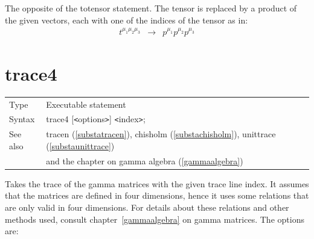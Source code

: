 \noindent The opposite of the totensor 
statement. The tensor is replaced by a product of the given vectors, each 
with one of the indices of the tensor as in:
\begin{eqnarray}
    t^{\mu_1\mu_2\mu_3} & \rightarrow & p^{\mu_1}p^{\mu_2}p^{\mu_3} \nonumber
\end{eqnarray}\vspace{10mm}


\section{trace4}
\label{substatrace}

\noindent \begin{tabular}{ll}
Type & Executable statement\\
Syntax & trace4 [{\tt<}options{\tt>}] {\tt<}index{\tt>}; \\
See also & tracen (\ref{substatracen}), chisholm (\ref{substachisholm}),
    unittrace (\ref{substaunittrace}) \\ &
    and the chapter on gamma algebra (\ref{gammaalgebra})
\end{tabular} \vspace{4mm}

\noindent Takes the trace of the gamma 
matrices with the given trace line 
index. It assumes that the matrices are 
defined in four dimensions, hence it uses some relations that are only 
valid in four dimensions. For details about these relations and other 
methods used, consult chapter~\ref{gammaalgebra} on gamma matrices. The 
options are: \vspace{4mm}




